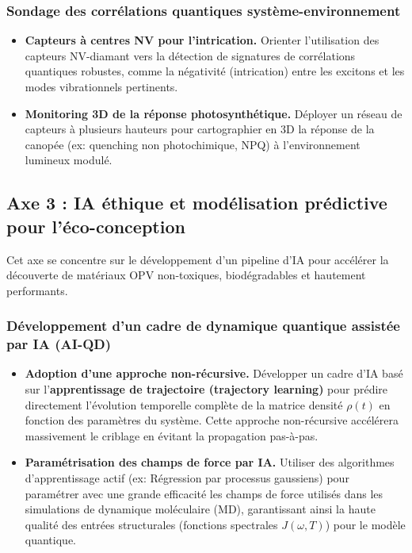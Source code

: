 \documentclass[12pt, a4paper]{article}
\begin{document}
\subsubsection{Sondage des corrélations quantiques système-environnement}
\begin{itemize}
    \item \textbf{Capteurs à centres NV pour l'intrication.} Orienter l'utilisation des capteurs NV-diamant vers la détection de signatures de corrélations quantiques robustes, comme la négativité (intrication) entre les excitons et les modes vibrationnels pertinents.
    \item \textbf{Monitoring 3D de la réponse photosynthétique.} Déployer un réseau de capteurs à plusieurs hauteurs pour cartographier en 3D la réponse de la canopée (ex: quenching non photochimique, NPQ) à l'environnement lumineux modulé.
\end{itemize}

\subsection{Axe 3 : IA éthique et modélisation prédictive pour l'éco-conception}

Cet axe se concentre sur le développement d'un pipeline d'IA pour accélérer la découverte de matériaux OPV non-toxiques, biodégradables et hautement performants.

\subsubsection{Développement d'un cadre de dynamique quantique assistée par IA (AI-QD)}
\begin{itemize}
    \item \textbf{Adoption d'une approche non-récursive.} Développer un cadre d'IA basé sur l'\textbf{apprentissage de trajectoire (trajectory learning)} pour prédire directement l'évolution temporelle complète de la matrice densité $\rho(t)$ en fonction des paramètres du système. Cette approche non-récursive accélérera massivement le criblage en évitant la propagation pas-à-pas.
    \item \textbf{Paramétrisation des champs de force par IA.} Utiliser des algorithmes d'apprentissage actif (ex: Régression par processus gaussiens) pour paramétrer avec une grande efficacité les champs de force utilisés dans les simulations de dynamique moléculaire (MD), garantissant ainsi la haute qualité des entrées structurales (fonctions spectrales $J(\omega, T)$) pour le modèle quantique.
\end{itemize}
\end{document}
